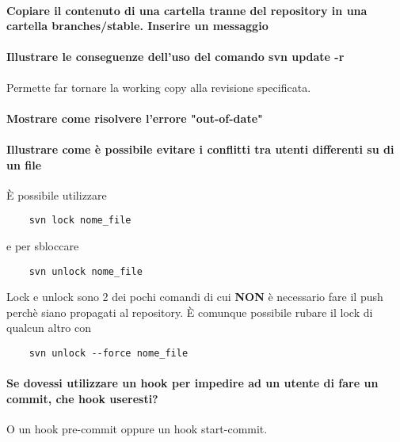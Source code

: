 \documentclass[a4paper]{article}
\begin{document}
	\paragraph{Copiare il contenuto di una cartella tranne del repository in una cartella branches/stable. Inserire un messaggio}

	\paragraph{Illustrare le conseguenze dell'uso del comando svn update -r}
	Permette far tornare la working copy alla revisione specificata.

	\paragraph{Mostrare come risolvere l'errore "out-of-date"}

	\paragraph{Illustrare come è possibile evitare i conflitti tra utenti differenti su di un file}
	È possibile utilizzare
	\begin{verbatim}
	svn lock nome_file
	\end{verbatim}
	e per sbloccare 
	\begin{verbatim}
	svn unlock nome_file
	\end{verbatim}
	Lock e unlock sono 2 dei pochi comandi di cui \textbf{NON} è necessario fare il push perchè siano propagati al repository.
	È comunque possibile rubare il lock di qualcun altro con
	\begin{verbatim}
	svn unlock --force nome_file
	\end{verbatim}

	\paragraph{Se dovessi utilizzare un hook per impedire ad un utente di fare un commit, che hook useresti?} O un hook pre-commit oppure un hook start-commit.
\end{document}
